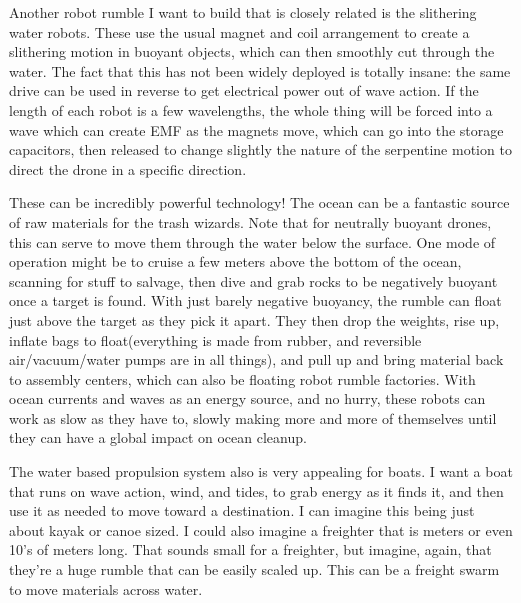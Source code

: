 Another robot rumble I want to build that is closely related is the
slithering water robots. These use the usual magnet and coil arrangement
to create a slithering motion in buoyant objects, which can then
smoothly cut through the water. The fact that this has not been widely
deployed is totally insane: the same drive can be used in reverse to get
electrical power out of wave action. If the length of each robot is a
few wavelengths, the whole thing will be forced into a wave which can
create EMF as the magnets move, which can go into the storage
capacitors, then released to change slightly the nature of the
serpentine motion to direct the drone in a specific direction.

These can be incredibly powerful technology! The ocean can be a
fantastic source of raw materials for the trash wizards. Note that for
neutrally buoyant drones, this can serve to move them through the water
below the surface. One mode of operation might be to cruise a few meters
above the bottom of the ocean, scanning for stuff to salvage, then dive
and grab rocks to be negatively buoyant once a target is found. With
just barely negative buoyancy, the rumble can float just above the
target as they pick it apart. They then drop the weights, rise up,
inflate bags to float(everything is made from rubber, and reversible
air/vacuum/water pumps are in all things), and pull up and bring
material back to assembly centers, which can also be floating robot
rumble factories. With ocean currents and waves as an energy source, and
no hurry, these robots can work as slow as they have to, slowly making
more and more of themselves until they can have a global impact on ocean
cleanup.

The water based propulsion system also is very appealing for boats. I
want a boat that runs on wave action, wind, and tides, to grab energy as
it finds it, and then use it as needed to move toward a destination. I
can imagine this being just about kayak or canoe sized. I could also
imagine a freighter that is meters or even 10's of meters long. That
sounds small for a freighter, but imagine, again, that they're a huge
rumble that can be easily scaled up. This can be a freight swarm to move
materials across water.

